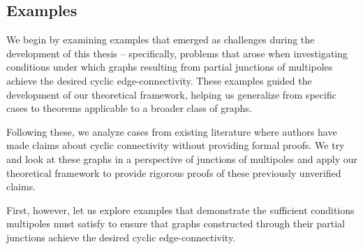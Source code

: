 \documentclass[12pt, twoside]{book}
\begin{document}
\subsection{Examples}\label{subs:examples}

We begin by examining examples that emerged as challenges during the development of this thesis -- specifically, problems that arose when investigating conditions under which graphs resulting from partial junctions of multipoles achieve the desired cyclic edge-connectivity. These examples guided the development of our theoretical framework, helping us generalize from specific cases to theorems applicable to a broader class of graphs.

Following these, we analyze cases from existing literature where authors have made claims about cyclic connectivity without providing formal proofs. We try and look at these graphs in a perspective of junctions of multipoles and apply our theoretical framework to provide rigorous proofs of these previously unverified claims.

First, however, let us explore examples that demonstrate the sufficient conditions multipoles must satisfy to ensure that graphs constructed through their partial junctions achieve the desired cyclic edge-connectivity.
\end{document}
